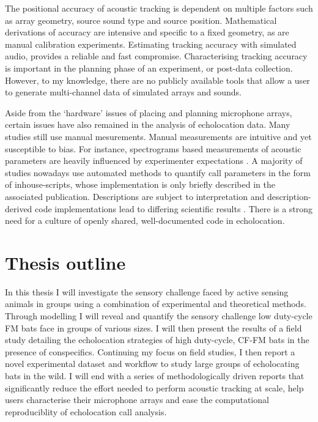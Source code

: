 \documentclass[
]{book}
\begin{document}
The positional accuracy of acoustic tracking is dependent on multiple factors such as array geometry, source sound type and source position. Mathematical derivations of accuracy are intensive and specific to a fixed geometry, as are manual calibration experiments. Estimating tracking accuracy with simulated audio, provides a reliable and fast compromise. Characterising tracking accuracy is important in the planning phase of an experiment, or post-data collection. However, to my knowledge, there are no publicly available tools that allow a user to generate multi-channel data of simulated arrays and sounds.

Aside from the `hardware' issues of placing and planning microphone arrays, certain issues have also remained in the analysis of echolocation data. Many studies still use manual mesurements. Manual measurements are intuitive and yet susceptible to bias. For instance, spectrograms based measurements of acoustic parameters are heavily influenced by experimenter expectations \citep{brummspecmanual}. A majority of studies nowadays use automated methods to quantify call parameters in the form of inhouse-scripts, whose implementation is only briefly described in the associated publication. Descriptions are subject to interpretation and description-derived code implementations lead to differing scientific results \citep{bakervincent2019, mcfee2018open}. There is a strong need for a culture of openly shared, well-documented code in echolocation.

\hypertarget{thesis-outline}{%
\section{Thesis outline}\label{thesis-outline}}

In this thesis I will investigate the sensory challenge faced by active sensing animals in groups using a combination of experimental and theoretical methods. Through modelling I will reveal and quantify the sensory challenge low duty-cycle FM bats face in groups of various sizes. I will then present the results of a field study detailing the echolocation strategies of high duty-cycle, CF-FM bats in the presence of conspecifics. Continuing my focus on field studies, I then report a novel experimental dataset and workflow to study large groups of echolocating bats in the wild. I will end with a series of methodologically driven reports that significantly reduce the effort needed to perform acoustic tracking at scale, help users characterise their microphone arrays and ease the computational reproduciblity of echolocation call analysis.
\end{document}
